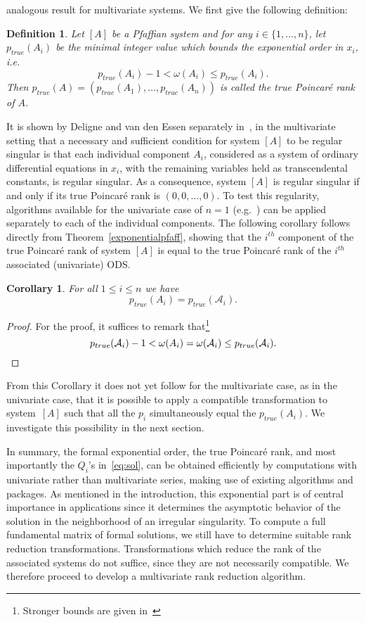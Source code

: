 \documentclass[final,1p,times,number,amsthm]{elsart}
\newtheorem{corollary}[lemma]{Corollary}
\newtheorem{definition}[lemma]{Definition}
\begin{document}
 analogous result for multivariate systems. We first give the following
 definition:
\begin{definition}
  Let $[A]$ be a Pfaffian system and for any $i\in\{1,\dots,n\}$, let
  $p_{true}(A_i)$ be the minimal integer value which bounds the exponential order
  in $x_i$, i.e.
  \[
  p_{true}(A_i) - 1 < \omega(A_i)  \leq p_{true}(A_i).
  \]
  Then $p_{true}(A)=(p_{true}(A_1),\dots,p_{true}(A_n))$ is
  called the true Poincar\'e rank of $A$.
\end{definition}
It is shown by Deligne and van den Essen separately in~\cite{key20,key21}, in
the multivariate setting that a necessary and sufficient condition for system
$[A]$ to be regular singular is that each individual component $A_i$, considered
as a system of ordinary differential equations in $x_i$, with the remaining
variables held as transcendental constants, is regular singular. As a
consequence, system $[A]$ is regular singular if and only if its true
Poincar\'{e} rank is $(0,0, \dots,0)$. To test this regularity, algorithms
available for the univariate case of $n=1$ (e.g.~\cite{key26,key57}) can be
applied separately to each of the individual components. The following corollary
follows directly from Theorem~\ref{exponentialpfaff}, showing that the $i^{th}$
component of the true Poincar\'e rank of system $[A]$ is equal to the  true
Poincar\'e rank of the $i^{th}$ associated (univariate) ODS.
\begin{corollary}
\label{prank}
For all $1\leq i\leq n$ we have
\[
  p_{true}(A_i) =p_{true}(\mathcal{A}_i).
\]
\end{corollary}
\begin{proof}
  For the proof, it suffices to remark that\footnote{Stronger bounds are given
    in~\cite[Remark 3]{key24}}
  \[p_{true}({\mathcal{A}}_{i}) -1 < \omega(A_i) = \omega({\mathcal{A}}_{i} ) \leq
    p_{true}({\mathcal{A}}_{i}).\qedhere\]
\end{proof}
From this Corollary it does not yet follow for the multivariate case, as in the
univariate case, that it is possible to apply a compatible transformation to
system~$[A]$ such that all the $p_i$ simultaneously equal the $p_{true}(A_i)$. We
investigate this possibility in the next section.

In summary, the formal exponential order, the true Poincar\'e rank, and most
importantly the $Q_i$'s in~\eqref{eq:sol}, can be obtained efficiently by
computations with univariate rather than multivariate series, making use of
existing algorithms and packages. As mentioned in the introduction, this
exponential part is of central importance in applications since it determines
the asymptotic behavior of the solution in the neighborhood of an irregular
singularity. To compute a full fundamental matrix of formal solutions, we still
have to determine suitable rank reduction transformations. Transformations which
reduce the rank of the associated systems do not suffice, since they are not
necessarily compatible. We therefore proceed to develop a multivariate rank
reduction algorithm.
\end{document}
